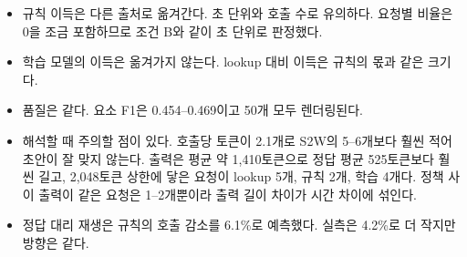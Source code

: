 \documentclass[10pt,a4paper]{article}
\begin{document}
\begin{itemize}[leftmargin=1.2em]
\item 규칙 이득은 다른 출처로 옮겨간다. 초 단위와 호출 수로 유의하다. 요청별 비율은 0을 조금 포함하므로 조건 B와 같이 초 단위로 판정했다.
\item 학습 모델의 이득은 옮겨가지 않는다. lookup 대비 이득은 규칙의 몫과 같은 크기다.
\item 품질은 같다. 요소 F1은 0.454--0.469이고 50개 모두 렌더링된다.
\item 해석할 때 주의할 점이 있다. 호출당 토큰이 2.1개로 S2W의 5--6개보다 훨씬 적어 초안이 잘 맞지 않는다. 출력은 평균 약 1,410토큰으로 정답 평균 525토큰보다 훨씬 길고, 2,048토큰 상한에 닿은 요청이 lookup 5개, 규칙 2개, 학습 4개다. 정책 사이 출력이 같은 요청은 1--2개뿐이라 출력 길이 차이가 시간 차이에 섞인다.
\item 정답 대리 재생은 규칙의 호출 감소를 6.1\%로 예측했다. 실측은 4.2\%로 더 작지만 방향은 같다.
\end{itemize}
\end{document}
